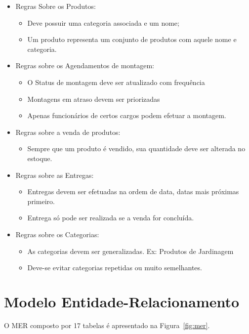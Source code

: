 \documentclass[
12pt,
a4paper,
semrecuonosumario,
sumario = abnt-6027-2012]{report}
\begin{document}
	\begin{itemize}
		\item Regras Sobre os Produtos:
			\begin{itemize}
				\item Deve possuir uma categoria associada e um nome;
				\item Um produto representa um conjunto de produtos com aquele nome e categoria.
			\end{itemize}
		\item Regras sobre os Agendamentos de montagem:
			\begin{itemize}
				\item O Status de montagem deve ser atualizado com frequência
				\item Montagens em atraso devem ser priorizadas
				\item Apenas funcionários de certos cargos podem efetuar a montagem.
			\end{itemize}
		\item Regras sobre a venda de produtos:
			\begin{itemize}
				\item Sempre que um produto é vendido, sua quantidade deve ser alterada no estoque.
			\end{itemize}
		\item Regras sobre as Entregas:
			\begin{itemize}
				\item Entregas devem ser efetuadas na ordem de data, datas mais próximas primeiro.
				\item Entrega só pode ser realizada se a venda for concluída.
			\end{itemize}
		\item Regras sobre os Categorias:
			\begin{itemize}
				\item As categorias devem ser generalizadas. Ex: Produtos de Jardinagem
				\item Deve-se evitar categorias repetidas ou muito semelhantes.
			\end{itemize}
	\end{itemize}

    \section{Modelo Entidade-Relacionamento}\label{sec:mer}
     O MER composto por 17 tabelas é apresentado na Figura~\ref{fig:mer}.
\end{document}
